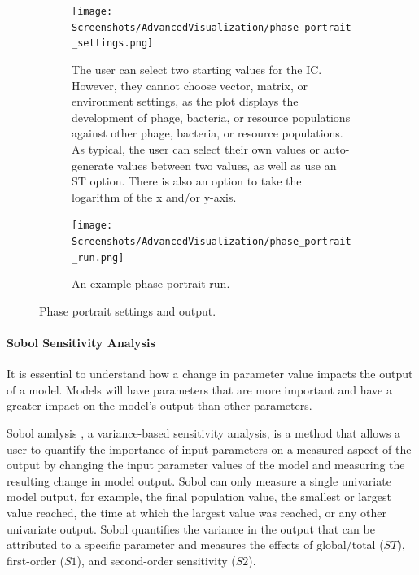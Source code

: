 \begin{figure}[h!]
    \centering
    \begin{subfigure}{0.49\linewidth}
        \centering
        \captionsetup{width=1\linewidth}
        \texttt{[image: Screenshots/AdvancedVisualization/phase\_portrait\_settings.png]}
        \caption{
            The user can select two starting values for the IC. 
            However, they cannot choose vector, matrix, or environment settings, as the plot displays the development of phage, bacteria, or resource populations against other phage, bacteria, or resource populations.
            As typical, the user can select their own values or auto-generate values between two values, as well as use an ST option.
            There is also an option to take the logarithm of the x and/or y-axis. 
        }
        \label{fig:ss:av:phase_portrait_settings}
    \end{subfigure}
    \hfill
    \begin{subfigure}{0.49\linewidth}
        \centering
        \captionsetup{width=1\linewidth}
        \texttt{[image: Screenshots/AdvancedVisualization/phase\_portrait\_run.png]}
        \caption{
            An example phase portrait run. 
        }
        \label{fig:ss:av:phase_portrait_run}
    \end{subfigure}
    \caption{Phase portrait settings and output. }
\end{figure}

\paragraph{Sobol Sensitivity Analysis}
\label{sec:Sobol_sensitivity_analysis}
It is essential to understand how a change in parameter value impacts the output of a model. 
Models will have parameters that are more important and have a greater impact on the model's output than other parameters. 

Sobol analysis \cite{sobolGlobalSensitivityIndices2001}, a variance-based sensitivity analysis, is a method that allows a user to quantify the importance of input parameters on a measured aspect of the output by changing the input parameter values of the model and measuring the resulting change in model output.
Sobol can only measure a single univariate model output, for example, the final population value, the smallest or largest value reached, the time at which the largest value was reached, or any other univariate output. 
Sobol quantifies the variance in the output that can be attributed to a specific parameter and measures the effects of global/total ($ST$), first-order ($S1$), and second-order sensitivity ($S2$). 

